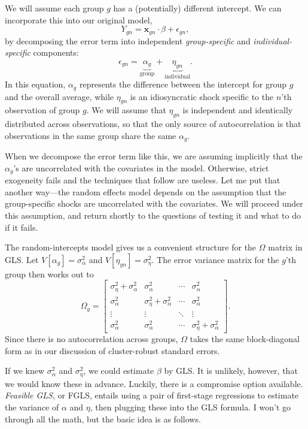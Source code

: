 \documentclass[12pt,oneside,openany]{book}
\begin{document}
We will assume each group \(g\) has a (potentially) different intercept.
We can incorporate this into our original model, \[
Y_{gn} = \mathbf{x}_{gn} \cdot \beta + \epsilon_{gn},
\] by decomposing the error term into independent \emph{group-specific}
and \emph{individual-specific} components: \[
\epsilon_{gn} = \underbrace{\alpha_g}_{\text{group}} + \underbrace{\eta_{gn}}_{\text{individual}}.
\] In this equation, \(\alpha_g\) represents the difference between the
intercept for group \(g\) and the overall average, while \(\eta_{gn}\)
is an idiosyncratic shock specific to the \(n\)'th observation of group
\(g\). We will assume that \(\eta_{gn}\) is independent and identically
distributed across observations, so that the only source of
autocorrelation is that observations in the same group share the same
\(\alpha_g\).

When we decompose the error term like this, we are assuming implicitly
that the \(\alpha_g\)'s are uncorrelated with the covariates in the
model. Otherwise, strict exogeneity fails and the techniques that follow
are useless. Let me put that another way---the random effects model
depends on the assumption that the group-specific shocks are
uncorrelated with the covariates. We will proceed under this assumption,
and return shortly to the questions of testing it and what to do if it
fails.

The random-intercepts model gives us a convenient structure for the
\(\Omega\) matrix in GLS. Let \(V[\alpha_g] = \sigma^2_\alpha\) and
\(V[\eta_{gn}] = \sigma^2_\eta\). The error variance matrix for the
\(g\)'th group then works out to \[
\Omega_g = \begin{bmatrix}
\sigma_{\eta}^2 + \sigma_{\alpha}^2 & \sigma_{\alpha}^2 & \cdots & \sigma_{\alpha}^2 \\
\sigma_{\alpha}^2 & \sigma_{\eta}^2 + \sigma_{\alpha}^2 & \cdots & \sigma_{\alpha}^2 \\
\vdots & \vdots & \ddots & \vdots \\
\sigma_{\alpha}^2 & \sigma_{\alpha}^2 & \cdots & \sigma_{\eta}^2 + \sigma_{\alpha}^2
\end{bmatrix}.
\] Since there is no autocorrelation across groups, \(\Omega\) takes the
same block-diagonal form as in our discussion of cluster-robust standard
errors.

If we knew \(\sigma^2_\alpha\) and \(\sigma^2_\eta\), we could estimate
\(\beta\) by GLS. It is unlikely, however, that we would know these in
advance. Luckily, there is a compromise option available. \emph{Feasible
GLS}, or FGLS, entails using a pair of first-stage regressions to
estimate the variance of \(\alpha\) and \(\eta\), then plugging these
into the GLS formula. I won't go through all the math, but the basic
idea is as follows.
\end{document}
